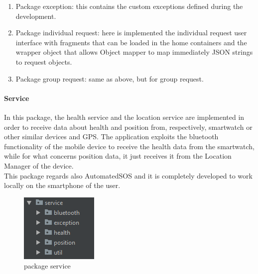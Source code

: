 \begin{enumerate}
\item Package exception: this contains the custom exceptions defined during the development.
\item Package individual request: here is implemented the individual request user interface with fragments that can be loaded in the home
containers and the wrapper object that allows Object mapper to map immediately JSON strings to request objects. 
\item Package group request: same as above, but for group request. 
\end{enumerate}
	
\paragraph{Service}
In this package, the health service and the location service are implemented in order to receive data about health and position 
from, respectively, smartwatch or other similar devices and GPS. 
The application exploits the bluetooth functionality of the mobile device to receive the health data from the smartwatch, while for what 
concerns position data, it just receives it from the Location Manager of the device.\\

This package regards also AutomatedSOS and it is completely developed to work locally on the smartphone of the user. 

\begin{figure}[H]
\includegraphics[width=\linewidth]{images/Service.png}
\caption{ package service }
\label{fig:pkgsharedata}
\end{figure}

